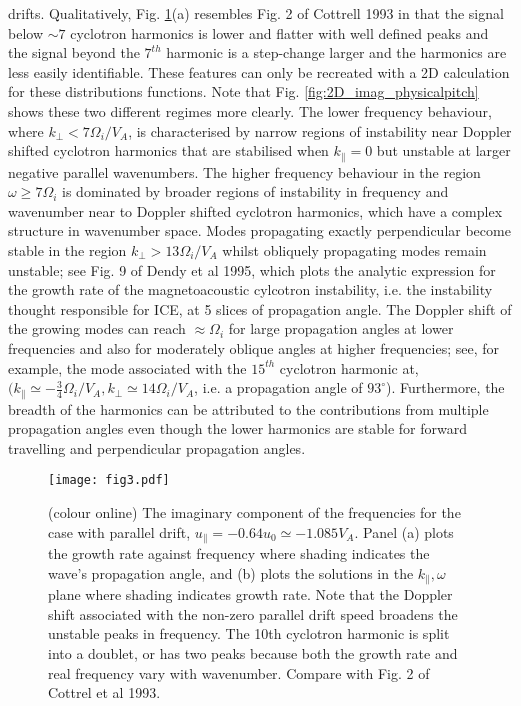 \documentclass[12pt]{iopart}
\begin{document}
drifts\cite{Cottrell1993,Fulop1998}. Qualitatively, Fig. \ref{fig:2D_F12_physicalpitch}(a) resembles Fig. 2 of Cottrell 1993 in that the signal below $\sim 7$ cyclotron harmonics is lower and flatter with well defined peaks and the signal beyond the $7^{th}$ harmonic is a step-change larger and the harmonics are less easily identifiable. These features can only be recreated with a 2D calculation for these distributions functions. Note that Fig. \ref{fig:2D_imag_physicalpitch} shows these two different regimes more clearly. The lower frequency behaviour, where $k_\perp < 7 \Omega_i/V_A$, is characterised by narrow regions of instability near Doppler shifted cyclotron harmonics that are stabilised when $k_\parallel=0$ but unstable at larger negative parallel wavenumbers. The higher frequency behaviour in the region $\omega\geq 7\Omega_i$ is dominated by broader regions of instability in frequency and wavenumber near to Doppler shifted cyclotron harmonics, which have a complex structure in wavenumber space. Modes propagating exactly perpendicular become stable in the region $k_\perp > 13 \Omega_i/V_A$ whilst obliquely propagating modes remain unstable; see Fig. 9 of Dendy et al 1995, which plots the analytic expression for the growth rate of the magnetoacoustic cylcotron instability, i.e. the instability thought responsible for ICE, at 5 slices of propagation angle. The Doppler shift of the growing modes can reach $\approx \Omega_i$ for large propagation angles at lower frequencies and also for moderately oblique angles at higher frequencies; see, for example, the mode associated with the $15^{th}$ cyclotron harmonic at, $(k_\parallel \simeq -\frac{3}{4} \Omega_i/V_A, k_\perp \simeq 14 \Omega_i/V_A$, i.e. a propagation angle of $93^\circ$). Furthermore, the breadth of the harmonics can be attributed to the contributions from multiple propagation angles even though the lower harmonics are stable for forward travelling and perpendicular propagation angles.

\begin{figure}[ht!]
    \raggedleft
\texttt{[image: fig3.pdf]}
    \caption{(colour online) The imaginary component of the frequencies for the case with parallel drift, $u_{\parallel} = -0.64 u_0 \simeq -1.085 V_A$. Panel (a) plots the growth rate against frequency where shading indicates the wave's propagation angle, and (b) plots the solutions in the $k_\parallel, \omega$ plane where shading indicates growth rate. Note that the Doppler shift associated with the non-zero parallel drift speed broadens the unstable peaks in frequency. The 10th cyclotron harmonic is split into a doublet, or has two peaks because both the growth rate and real frequency vary with wavenumber. Compare with Fig. 2 of Cottrel et al 1993.}
    \label{fig:2D_F12_physicalpitch}
\end{figure}
\end{document}
